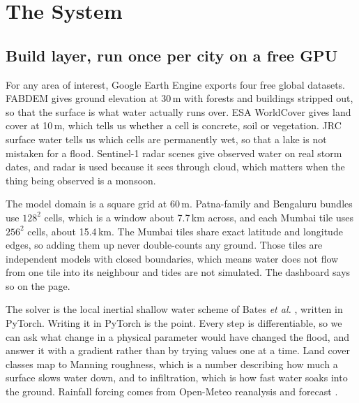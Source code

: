\section{The System}
\label{sec:system}

\subsection{Build layer, run once per city on a free GPU}
For any area of interest, Google Earth Engine exports four free global datasets. FABDEM
\cite{hawker2022fabdem} gives ground elevation at 30\,m with forests and buildings stripped out, so
that the surface is what water actually runs over. ESA WorldCover \cite{zanaga2021worldcover} gives
land cover at 10\,m, which tells us whether a cell is concrete, soil or vegetation. JRC surface
water \cite{pekel2016} tells us which cells are permanently wet, so that a lake is not mistaken for
a flood. Sentinel-1 radar scenes \cite{torres2012} give observed water on real storm dates, and
radar is used because it sees through cloud, which matters when the thing being observed is a
monsoon.

The model domain is a square grid at 60\,m. Patna-family and Bengaluru bundles use $128^2$ cells,
which is a window about 7.7\,km across, and each Mumbai tile uses $256^2$ cells, about 15.4\,km.
The Mumbai tiles share exact latitude and longitude edges, so adding them up never double-counts
any ground. Those tiles are independent models with closed boundaries, which means water does not
flow from one tile into its neighbour and tides are not simulated. The dashboard says so on the
page.

The solver is the local inertial shallow water scheme of Bates \emph{et al.} \cite{bates2010},
written in PyTorch. Writing it in PyTorch is the point. Every step is differentiable, so we can ask
what change in a physical parameter would have changed the flood, and answer it with a gradient
rather than by trying values one at a time. Land cover classes map to Manning roughness, which is a
number describing how much a surface slows water down, and to infiltration, which is how fast water
soaks into the ground. Rainfall forcing comes from Open-Meteo reanalysis and forecast
\cite{openmeteo}.

